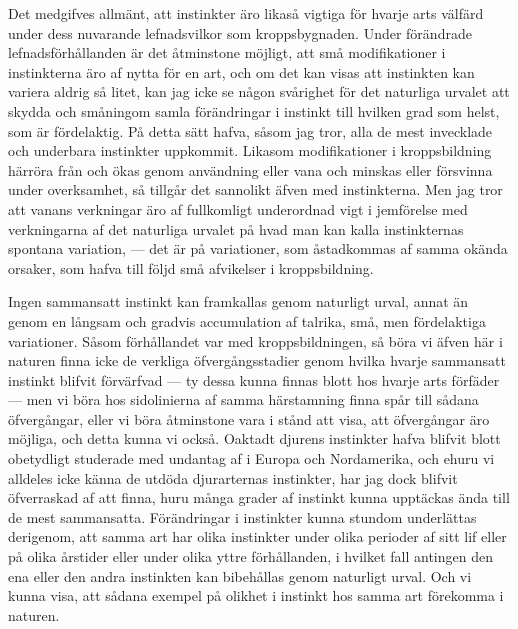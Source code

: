 Det medgifves allmänt, att instinkter äro likaså vigtiga för hvarje arts välfärd under dess nuvarande lefnadsvilkor som kroppsbygnaden. Under förändrade lefnadsförhållanden är det åtminstone möjligt, att små modifikationer i instinkterna äro af nytta för en art, och om det kan visas att instinkten kan variera aldrig så litet, kan jag icke se någon svårighet för det naturliga urvalet att skydda och småningom samla förändringar i instinkt till hvilken grad som helst, som är fördelaktig. På detta sätt hafva, såsom jag tror, alla de mest invecklade och underbara instinkter uppkommit. Likasom modifikationer i kroppsbildning härröra från och ökas genom användning eller vana och minskas eller försvinna under overksamhet, så tillgår det sannolikt äfven med instinkterna. Men jag tror att vanans verkningar äro af fullkomligt underordnad vigt i jemförelse med verkningarna af det naturliga urvalet på hvad man kan kalla instinkternas spontana variation, — det är på variationer, som åstadkommas af samma okända orsaker, som hafva till följd små afvikelser i kroppsbildning.

Ingen sammansatt instinkt kan framkallas genom naturligt urval, annat än genom en långsam och gradvis accumulation af talrika, små, men fördelaktiga variationer. Såsom förhållandet var med kroppsbildningen, så böra vi äfven här i naturen finna icke de verkliga öfvergångsstadier genom hvilka hvarje sammansatt instinkt blifvit förvärfvad — ty dessa kunna finnas blott hos hvarje arts förfäder — men vi böra hos sidolinierna af samma härstamning finna spår till sådana öfvergångar, eller vi böra åtminstone vara i stånd att visa, att öfvergångar äro möjliga, och detta kunna vi också. Oaktadt djurens instinkter hafva blifvit blott obetydligt studerade med undantag af i Europa och Nordamerika, och ehuru vi alldeles icke känna de utdöda djurarternas instinkter, har jag dock blifvit öfverraskad af att finna, huru många grader af instinkt kunna upptäckas ända till de mest sammansatta. Förändringar i instinkter kunna stundom underlättas derigenom, att samma art har olika instinkter under olika perioder af sitt lif eller på olika årstider eller under olika yttre förhållanden, i hvilket fall antingen den ena eller den andra instinkten kan bibehållas genom naturligt urval. Och vi kunna visa, att sådana exempel på olikhet i instinkt hos samma art förekomma i naturen.

